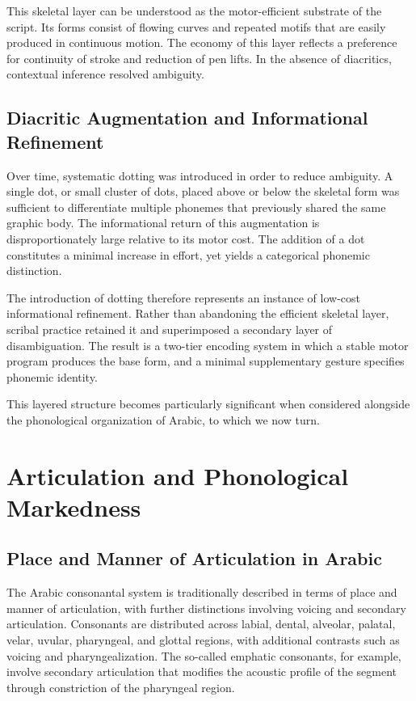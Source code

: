 \documentclass[11pt]{article}
\begin{document}
This skeletal layer can be understood as the motor-efficient substrate of the script. Its forms consist of flowing curves and repeated motifs that are easily produced in continuous motion. The economy of this layer reflects a preference for continuity of stroke and reduction of pen lifts. In the absence of diacritics, contextual inference resolved ambiguity.

\subsection{Diacritic Augmentation and Informational Refinement}

Over time, systematic dotting was introduced in order to reduce ambiguity. A single dot, or small cluster of dots, placed above or below the skeletal form was sufficient to differentiate multiple phonemes that previously shared the same graphic body. The informational return of this augmentation is disproportionately large relative to its motor cost. The addition of a dot constitutes a minimal increase in effort, yet yields a categorical phonemic distinction.

The introduction of dotting therefore represents an instance of low-cost informational refinement. Rather than abandoning the efficient skeletal layer, scribal practice retained it and superimposed a secondary layer of disambiguation. The result is a two-tier encoding system in which a stable motor program produces the base form, and a minimal supplementary gesture specifies phonemic identity.

This layered structure becomes particularly significant when considered alongside the phonological organization of Arabic, to which we now turn.

\section{Articulation and Phonological Markedness}

\subsection{Place and Manner of Articulation in Arabic}

The Arabic consonantal system is traditionally described in terms of place and manner of articulation, with further distinctions involving voicing and secondary articulation. Consonants are distributed across labial, dental, alveolar, palatal, velar, uvular, pharyngeal, and glottal regions, with additional contrasts such as voicing and pharyngealization. The so-called emphatic consonants, for example, involve secondary articulation that modifies the acoustic profile of the segment through constriction of the pharyngeal region.
\end{document}
